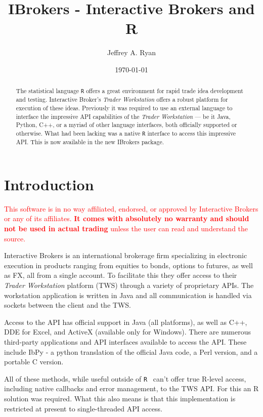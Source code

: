 \documentclass{article}
\title{\bf IBrokers - Interactive Brokers and R }
\author{Jeffrey A. Ryan}
\date{\today}
\begin{document}
\maketitle
\tableofcontents

\begin{abstract}
The statistical language {\tt R}
offers a great environment for rapid trade
idea development and testing. Interactive Broker's
\emph{Trader Workstation} offers a
robust platform for execution of these ideas.
Previously it was required to use an external
language to interface the impressive API
capabilities of the \emph{Trader Workstation} --- be
it Java, Python, C++, or a myriad of other
language interfaces, both officially supported
or otherwise.
What had been lacking was a native {\tt R} interface
to access this impressive API.  This is now available
in the new IBrokers package.
\end{abstract}

\section{Introduction}
\textcolor{red}{
This software is in no way affiliated, endorsed, or approved by
     Interactive Brokers or any of its affiliates. \textbf{It comes with
     absolutely no warranty and should not be used in actual trading}
     unless the user can read and understand the source.
}

Interactive Brokers \cite{TWS} is an international brokerage
firm specializing in electronic execution in
products ranging from equities to bonds, options to futures,
as well as FX, all from a single account. To facilitate
this they offer access to their \emph{Trader Workstation}
platform (TWS) through a variety of proprietary APIs.
The workstation application is written
in Java and all communication is handled via sockets
between the client and the TWS.

Access to the API has official support in
Java (all platforms), as well as C++, DDE for Excel, and ActiveX
(available only for Windows). There are numerous third-party
applications and API interfaces available to access the
API. These include IbPy - a python translation of the
official Java code, a Perl version, and a portable C version.

All of these methods, while useful outside of {\tt R}~\cite{R}
can't offer true R-level access, including
native callbacks and error management, to the TWS API.  For this an
R solution was required. What this also means is that this implementation
is restricted at present to single-threaded API access.
\end{document}
